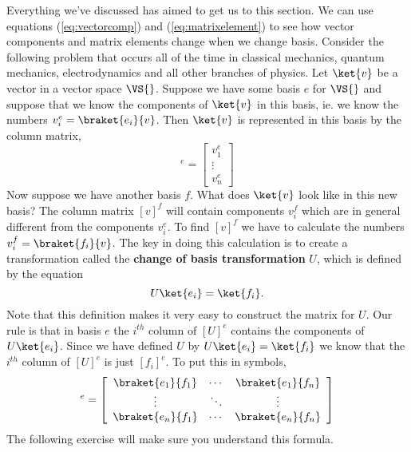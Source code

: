 Everything we've discussed has aimed to get us to this section.  We can use equations (\ref{eq:vectorcomp}) and (\ref{eq:matrixelement}) to see how vector components and matrix elements change when we change basis.  Consider the following problem that occurs all of the time in classical mechanics, quantum mechanics, electrodynamics and all other branches of physics.  Let $\ket{v}$ be a vector in a vector space $\VS{}$.  Suppose we have some basis $e$ for $\VS{}$ and suppose that we know the components of $\ket{v}$ in this basis, ie. we know the numbers $v^e_i = \braket{e_i}{v}$.  Then $\ket{v}$ is represented in this basis by the column matrix,
\begin{displaymath}
[v]^e = \left[ \begin{array}{c} v^e_1 \\ \vdots \\ v^e_n \end{array} \right] \end{displaymath}
Now suppose we have another basis $f$.  What does $\ket{v}$ look like in this new basis?  The column matrix $[v]^f$ will contain components $v_i^f$ which are in general different from the components $v_i^e$.  To find $[v]^f$ we have to calculate the numbers $v^f_i = \braket{f_i}{v}$.  The key in doing this calculation is to create a transformation called the \textbf{change of basis transformation} $U$, which is defined by the equation
\begin{displaymath} U\ket{e_i} = \ket{f_i}. \end{displaymath}
Note that this definition makes it very easy to construct the matrix for $U$.  Our rule is that in basis $e$ the $i^{th}$ column of $[U]^e$ contains the components of $U\ket{e_i}$.  Since we have defined $U$ by $U\ket{e_i} = \ket{f_i}$ we know that the $i^{th}$ column of $[U]^e$ is just $[f_i]^e$. To put this in symbols,
\begin{displaymath}
[U]^e = \left[ \begin{array}{ccc} \braket{e_1}{f_1} & \cdots & \braket{e_1}{f_n} \\ \vdots & \ddots & \vdots \\ \braket{e_n}{f_1} & \cdots & \braket{e_n}{f_n} \end{array} \right]
\end{displaymath}
The following exercise will make sure you understand this formula.

